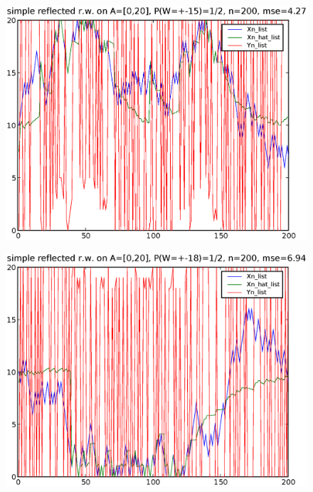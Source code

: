 \documentclass[a4paper,10pt]{article}
\begin{document}
\begin{figure}
\includegraphics[width=1\textwidth]{hw5_1_K_20_L_15_n_200.eps}
\caption{}
\end{figure}

\begin{figure}
\includegraphics[width=1\textwidth]{hw5_1_K_20_L_18_n_200.eps}
\caption{}
\end{figure}
\end{document}
